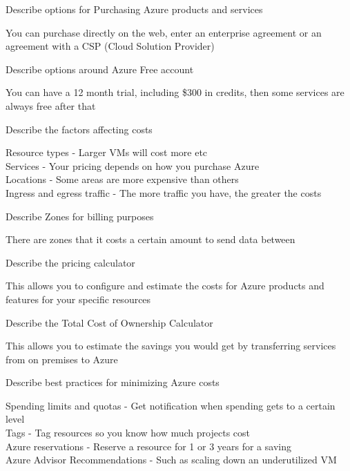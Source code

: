 \documentclass[addpoints]{exam}
\begin{document}
\begin{questions}
\question Describe options for Purchasing Azure products and services
\begin{solution}[2in]
	You can purchase directly on the web, enter an enterprise agreement or an agreement with a CSP (Cloud Solution Provider)
	
\end{solution}

\question Describe options around Azure Free account
\begin{solution}[2in]
	You can have a 12 month trial, including \$300 in credits, then some services are always free after that
 	
\end{solution}

\question Describe the factors affecting costs
\begin{solution}[2in]
	Resource types - Larger VMs will cost more etc\\
	Services - Your pricing depends on how you purchase Azure\\
	Locations - Some areas are more expensive than others\\
	Ingress and egress traffic - The more traffic you have, the greater the costs
	
\end{solution}

\question Describe Zones for billing purposes
\begin{solution}[2in]
	There are zones that it costs a certain amount to send data between
	
\end{solution}

\question Describe the pricing calculator
\begin{solution}[2in]
	This allows you to configure and estimate the costs for Azure products and features for your specific resources
	
\end{solution}

\question Describe the Total Cost of Ownership Calculator
\begin{solution}[2in]
	This allows you to estimate the savings you would get by transferring services from on premises to Azure
	
\end{solution}

\question Describe best practices for minimizing Azure costs
\begin{solution}[2in]
	Spending limits and quotas - Get notification when spending gets to a certain level\\
	Tags - Tag resources so you know how much projects cost\\
	Azure reservations - Reserve a resource for 1 or 3 years for a saving\\
	Azure Advisor Recommendations - Such as scaling down an underutilized VM
	

\end{solution}
\end{questions}
\end{document}
